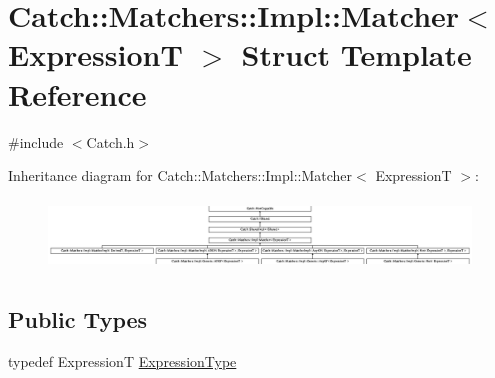 \hypertarget{struct_catch_1_1_matchers_1_1_impl_1_1_matcher}{}\section{Catch\+:\+:Matchers\+:\+:Impl\+:\+:Matcher$<$ ExpressionT $>$ Struct Template Reference}
\label{struct_catch_1_1_matchers_1_1_impl_1_1_matcher}


{\ttfamily \#include $<$Catch.\+h$>$}

Inheritance diagram for Catch\+:\+:Matchers\+:\+:Impl\+:\+:Matcher$<$ ExpressionT $>$\+:\begin{figure}[H]
\begin{center}
\leavevmode
\includegraphics[height=1.879195cm]{struct_catch_1_1_matchers_1_1_impl_1_1_matcher}
\end{center}
\end{figure}
\subsection*{Public Types}
\begin{DoxyCompactItemize}
\item 
typedef ExpressionT \hyperlink{struct_catch_1_1_matchers_1_1_impl_1_1_matcher_a7f5068cbacd1eed06cf243e63446e7e1}{Expression\+Type}
\end{DoxyCompactItemize}
